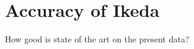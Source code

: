 \section{Accuracy of Ikeda}
\label{se:accuracyOfIkeda}
How good is state of the art on the present data?